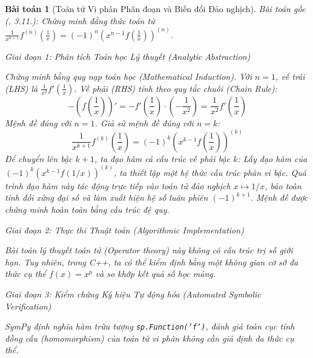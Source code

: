 \documentclass{article}
\newtheorem{baitoan}{Bài toán}
\begin{document}
\begin{baitoan}[Toán tử Vi phân Phân đoạn và Biến đổi Đảo nghịch]
 \emph{Bài toán gốc (\cite{Quoc_Long_Dat_Nam_VMC}, 3.11.):} 
 Chứng minh đẳng thức toán tử $\frac{1}{x^{n+1}}f^{(n)}\left(\frac{1}{x}\right) = (-1)^n\left(x^{n-1}f\left(\frac{1}{x}\right)\right)^{(n)}$.

\vspace{0.5em}\noindent\emph{Giai đoạn 1: Phân tích Toán học Lý thuyết (Analytic Abstraction)}
 
 Chứng minh bằng quy nạp toán học (Mathematical Induction).
 Với $n = 1$, vế trái (LHS) là $\frac{1}{x^2}f'\left(\frac{1}{x}\right)$. Vế phải (RHS) tính theo quy tắc chuỗi (Chain Rule): 
 \begin{equation}
 -\left(f\left(\frac{1}{x}\right)\right)' = -f'\left(\frac{1}{x}\right) \cdot \left(-\frac{1}{x^2}\right) = \frac{1}{x^2}f'\left(\frac{1}{x}\right)
 \end{equation}
 Mệnh đề đúng với $n=1$. Giả sử mệnh đề đúng với $n=k$:
 \begin{equation}
 \frac{1}{x^{k+1}}f^{(k)}\left(\frac{1}{x}\right) = (-1)^k\left(x^{k-1}f\left(\frac{1}{x}\right)\right)^{(k)}
 \end{equation}
 Để chuyển lên bậc $k+1$, ta đạo hàm cả cấu trúc vế phải bậc $k$:
 Lấy đạo hàm của $(-1)^k (x^{k-1}f(1/x))^{(k)}$, ta thiết lập một hệ thức cấu trúc phân vi bậc. Quá trình đạo hàm này tác động trực tiếp vào toán tử đảo nghịch $x \mapsto 1/x$, bảo toàn tính đối xứng đại số và làm xuất hiện hệ số luân phiên $(-1)^{k+1}$. Mệnh đề được chứng minh hoàn toàn bằng cấu trúc đệ quy.

\vspace{0.5em}\noindent\emph{Giai đoạn 2: Thực thi Thuật toán (Algorithmic Implementation)}
 
 Bài toán lý thuyết toán tử (Operator theory) này không có cấu trúc trị số giới hạn. Tuy nhiên, trong C++, ta có thể kiểm định bằng một không gian cơ sở đa thức cụ thể $f(x) = x^p$ và so khớp kết quả số học mảng.



\vspace{0.5em}\noindent\emph{Giai đoạn 3: Kiểm chứng Ký hiệu Tự động hóa (Automated Symbolic Verification)}
 
 \textsf{SymPy} định nghĩa hàm trừu tượng \texttt{sp.Function('f')}, đánh giá toàn cục tính đồng cấu (homomorphism) của toán tử vi phân không cần giả định đa thức cụ thể.


\end{baitoan}
\end{document}
